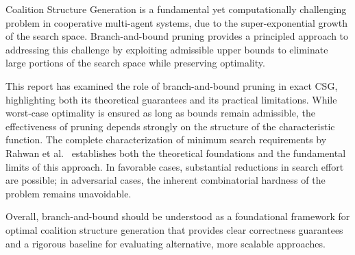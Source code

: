\documentclass{article}
\begin{document}
Coalition Structure Generation is a fundamental yet computationally challenging problem in cooperative multi-agent systems, due to the super-exponential growth of the search space. Branch-and-bound pruning provides a principled approach to addressing this challenge by exploiting admissible upper bounds to eliminate large portions of the search space while preserving optimality.

This report has examined the role of branch-and-bound pruning in exact CSG, highlighting both its theoretical guarantees and its practical limitations. While worst-case optimality is ensured as long as bounds remain admissible, the effectiveness of pruning depends strongly on the structure of the characteristic function. The complete characterization of minimum search requirements by Rahwan et al.~\cite{rahwan2011minimum} establishes both the theoretical foundations and the fundamental limits of this approach. In favorable cases, substantial reductions in search effort are possible; in adversarial cases, the inherent combinatorial hardness of the problem remains unavoidable.

Overall, branch-and-bound should be understood as a foundational framework for optimal coalition structure generation that provides clear correctness guarantees and a rigorous baseline for evaluating alternative, more scalable approaches.



\end{document}
